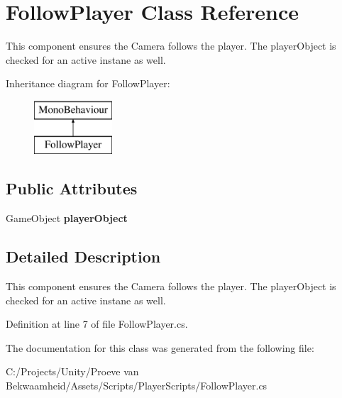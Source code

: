 \hypertarget{class_follow_player}{\section{Follow\+Player Class Reference}
\label{class_follow_player}
}


This component ensures the Camera follows the player. The player\+Object is checked for an active instane as well.  


Inheritance diagram for Follow\+Player\+:\begin{figure}[H]
\begin{center}
\leavevmode
\includegraphics[height=2.000000cm]{class_follow_player}
\end{center}
\end{figure}
\subsection*{Public Attributes}
\begin{DoxyCompactItemize}
\item 
\hypertarget{class_follow_player_a9e8f8c2056e1c3e3dd80d14536adabcd}{Game\+Object {\bfseries player\+Object}}\label{class_follow_player_a9e8f8c2056e1c3e3dd80d14536adabcd}

\end{DoxyCompactItemize}


\subsection{Detailed Description}
This component ensures the Camera follows the player. The player\+Object is checked for an active instane as well. 



Definition at line 7 of file Follow\+Player.\+cs.



The documentation for this class was generated from the following file\+:\begin{DoxyCompactItemize}
\item 
C\+:/\+Projects/\+Unity/\+Proeve van Bekwaamheid/\+Assets/\+Scripts/\+Player\+Scripts/Follow\+Player.\+cs\end{DoxyCompactItemize}
